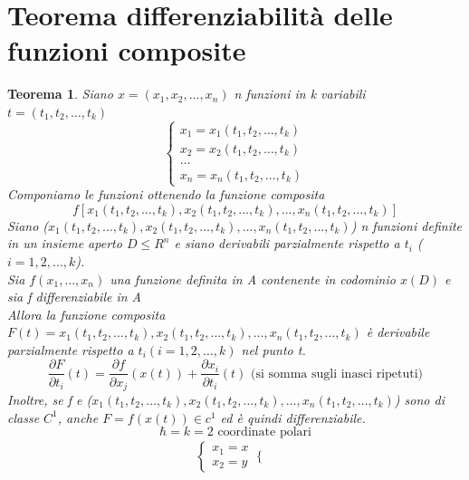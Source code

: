 \documentclass{book}
\newtheorem{teorema}{Teorema}
\begin{document}
\section{Teorema differenziabilità delle funzioni composite}
\begin{teorema}
	Siano $x=(x_1,x_2,\dots,x_n)$ n funzioni in k variabili
	$t=(t_1,t_2,\dots,t_k)$
	\begin{equation}
		\begin{cases}
			x_1=x_1(t_1,t_2,\dots,t_k)\\
			x_2=x_2(t_1,t_2,\dots,t_k)\\
			\dots\\
			x_n=x_n(t_1,t_2,\dots,t_k)
		\end{cases}
	\end{equation}
	Componiamo le funzioni ottenendo la funzione composita
	\begin{equation*}
		f[x_1(t_1,t_2,\dots,t_k), x_2(t_1,t_2,\dots,t_k), \dots,
		x_n(t_1,t_2,\dots,t_k)]
	\end{equation*}
	Siano ($x_1(t_1,t_2,\dots,t_k), x_2(t_1,t_2,\dots,t_k), \dots,
		x_n(t_1,t_2,\dots,t_k)$) n funzioni definite in un insieme aperto
		$D\leq R^n$ e siano derivabili parzialmente rispetto a $t_i$
		($i=1,2,\dots, k$).\\
		Sia $f(x_1,\dots,x_n)$ una funzione definita in A contenente in
		codominio $x(D)$ e sia f differenziabile in A\\
	Allora la funzione composita $F(t)=x_1(t_1,t_2,\dots,t_k), x_2(t_1,t_2, 
		\dots,t_k), \dots, x_n(t_1,t_2,\dots,t_k)$ è derivabile parzialmente
		rispetto a $t_i(i=1,2,\dots,k)$ nel punto t.
		\begin{equation*}
			\frac{\partial F}{\partial t_i} (t)=\frac{\partial f}{\partial
			x_j}(x(t))+\frac{\partial x_i}{\partial t_i}(t) \text{ (si somma
			sugli inasci ripetuti)}
		\end{equation*}
		Inoltre, se f e ($x_1(t_1,t_2,\dots,t_k), x_2(t_1,t_2,\dots,t_k), \dots,
		x_n(t_1,t_2,\dots,t_k)$) sono di classe $C^1$, anche $F=f(x(t))\in c^1$
		ed è quindi differenziabile.
		\begin{equation*}
			\hbar=k=2 \text{ coordinate polari}
		\end{equation*}
		\begin{equation*}
			\begin{matrix}
				\begin{cases}
					x_1=x\\
					x_2=y
				\end{cases}
				\begin{cases}

\end{cases}
\end{matrix}
\end{equation*}
\end{teorema}
\end{document}
